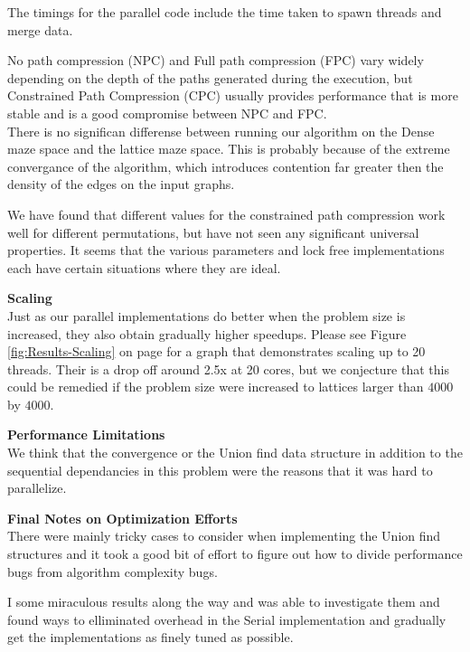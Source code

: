 \documentclass[11pt]{article}
\begin{document}
The timings for the parallel code include the time taken to spawn threads and merge data.

No path compression (NPC) and Full path compression (FPC) vary widely depending on the depth of the paths generated during the execution, but Constrained Path Compression (CPC) usually provides performance that is more stable and is a good compromise between NPC and FPC.\\

There is no significan differense between running our algorithm on the Dense maze space and the lattice maze space. This is probably because of the extreme convergance of the algorithm, which introduces contention far greater then the density of the edges on the input graphs.

We have found that different values for the constrained path compression work well for different permutations, but have not seen any significant universal properties. It seems that the various parameters and lock free implementations each have certain situations where they are ideal.


\textbf{Scaling}\\
Just as our parallel implementations do better when the problem size is increased, they also obtain gradually higher speedups. Please see Figure \ref{fig:Results-Scaling} on page \pageref{fig:Results-Scaling} for a graph that demonstrates scaling up to 20 threads. Their is a drop off around 2.5x at 20 cores, but we conjecture that this could be remedied if the problem size were increased to lattices larger than $4000$ by $4000$.

\textbf{Performance Limitations}\\

We think that the convergence or the Union find data structure in addition to the sequential dependancies in this problem were the reasons that it was hard to parallelize.

\textbf{Final Notes on Optimization Efforts}\\


There were mainly tricky cases to consider when implementing the Union find structures and it took a good bit of effort to figure out how to divide performance bugs from algorithm complexity bugs.

I some miraculous results along the way and was able to investigate them and found ways to elliminated overhead in the Serial implementation and gradually get the implementations as finely tuned as possible.
\end{document}
